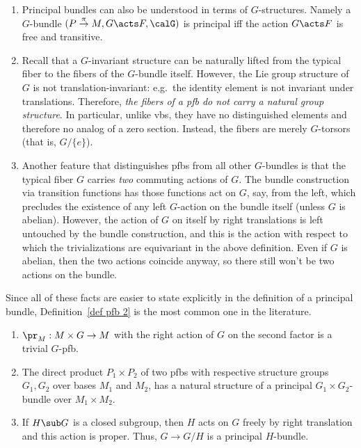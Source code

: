 \begin{rem}
    \begin{enumerate}
        \item Principal bundles can also be understood in terms of $G$-structures. Namely a $G$-bundle $(P\overset{\pi}{\to}M,G\acts F,\calG)$ is principal iff the action $G\acts F$ is free and transitive. 
        
        \item Recall that a $G$-invariant structure can be naturally lifted from the typical fiber to the fibers of the $G$-bundle itself. However, the Lie group structure of $G$ is not translation-invariant: e.g.\ the identity element is not invariant under translations. Therefore, \emph{the fibers of a \gls{pfb} do not carry a natural group structure}. In particular, unlike \glspl{vb}, they have no distinguished elements and therefore no analog of a zero section. Instead, the fibers are merely $G$-torsors (that is, $G\slash \{e\}$).

        \item Another feature that distinguishes \glspl{pfb} from all other $G$-bundles is that the typical fiber $G$ carries \emph{two} commuting actions of $G$. The bundle construction via transition functions has those functions act on $G$, say, from the left, which precludes the existence of any left $G$-action on the bundle itself (unless $G$ is abelian). However, the action of $G$ on itself by right translations is left untouched by the bundle construction, and this is the action with respect to which the trivializations are equivariant in the above definition. Even if $G$ is abelian, then the two actions coincide anyway, so there still won't be two actions on the bundle.
    \end{enumerate}
    Since all of these facts are easier to state explicitly in the definition of a principal bundle, Definition~\ref{def pfb 2} is the most common one in the literature.
\end{rem}




\begin{example}
    \begin{enumerate}
        \item $\pr_M:M\times G\to M$ with the right action of $G$ on the second factor is a trivial $G$-\gls{pfb}.
        \item The direct product $P_1\times P_2$ of two \glspl{pfb} with respective structure groups $G_1,G_2$ over bases $M_1$ and $M_2$, has a natural structure of a principal $G_1\times G_2$-bundle over $M_1\times M_2$.
        \item If $H\sub G$ is a closed subgroup, then $H$ acts on $G$ freely by right translation and this action is proper. Thus, $G\to G\slash H$ is a principal $H$-bundle.
    \end{enumerate}
\end{example}

